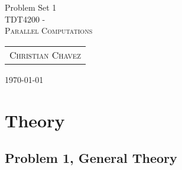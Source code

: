 \documentclass[fontsize=11pt, paper=a4, titlepage]{article}
\begin{document}
\begin{center}

{\huge Problem Set 1}\\[0.5cm]

\textsc{\LARGE TDT4200 -}\\[0.5cm]
\textsc{\large Parallel Computations}\\[1.0cm]

\begin{table}[h]
	\centering
	\begin{tabular}{c}
		\textsc{Christian Chavez}
	\end{tabular}
\end{table}

\vfill
\large{\today}
\end{center}
\clearpage

\section{Theory}
\subsection{Problem 1, General Theory}

\end{document}
